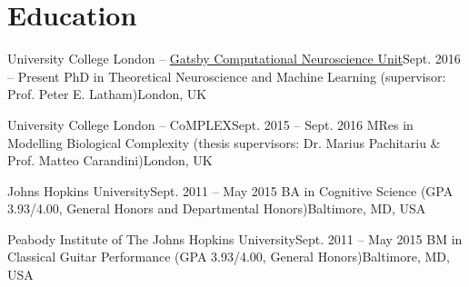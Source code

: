 
\section{Education}

\resumeSubHeadingListStart
  
  \resumeSubheading
  {University College London -- \href{http://www.gatsby.ucl.ac.uk/}{Gatsby Computational Neuroscience Unit}}{Sept. 2016 -- Present}
  {PhD in Theoretical Neuroscience and Machine Learning (supervisor: Prof. Peter E. Latham)}{London, UK}

  \resumeSubheading
  {University College London -- CoMPLEX}{Sept. 2015 -- Sept. 2016}
  {MRes in Modelling Biological Complexity (thesis supervisors: Dr. Marius Pachitariu \& Prof. Matteo Carandini)}{London, UK}

  \resumeSubheading
  {Johns Hopkins University}{Sept. 2011 -- May 2015}
  {BA in Cognitive Science (GPA 3.93/4.00, General Honors and Departmental Honors)}{Baltimore, MD, USA}
  
  \resumeSubheading
  {Peabody Institute of The Johns Hopkins University}{Sept. 2011 -- May 2015}
  {BM in Classical Guitar Performance (GPA 3.93/4.00, General Honors)}{Baltimore, MD, USA}

\resumeSubHeadingListEnd


% 
